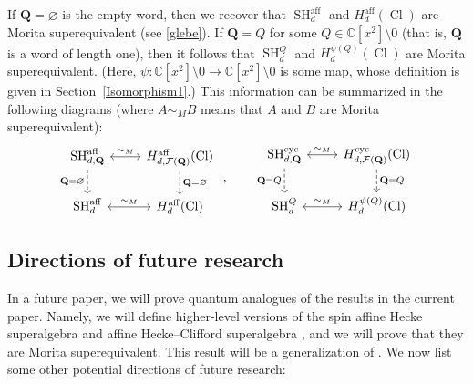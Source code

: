 \documentclass[11pt]{amsart}
\theoremstyle{definition}
\numberwithin{equation}{section}
\begin{document}
If $ \mathbf{Q} = \varnothing $ is the empty word, then we recover that $ \operatorname{SH}^{\operatorname{aff}}_{d} $ and $ H_{d}^{\operatorname{aff}}(\operatorname{Cl}) $ are Morita superequivalent (see \cref{glebe}). If $ \mathbf{Q} = Q $ for some $ Q \in \mathbb{C}[x^{2}] \setminus 0 $ (that is, $ \mathbf{Q} $ is a word of length one), then it follows that $ \operatorname{SH}^{Q}_{d} $ and $ H_{d}^{\psi(Q)}(\operatorname{Cl}) $ are Morita superequivalent. (Here, $ \psi \colon \mathbb{C}[x^{2}] \setminus 0 \rightarrow \mathbb{C}[x^{2}] \setminus 0 $ is some map, whose definition is given in Section~\ref{Isomorphism1}.) This information can be summarized in the following diagrams (where $ A \sim_{M} B $ means that \(A\) and \(B\) are Morita superequivalent):
\begin{equation}
\begin{tikzcd}
\operatorname{SH}^{\operatorname{aff}}_{d,\mathbf{Q}} \arrow[r, "\sim_M", <->] \arrow[d, dashed, "\mathbf{Q}=\varnothing"'] 
  & H_{d,\mathcal{F}(\mathbf{Q})}^{\operatorname{aff}}(\operatorname{Cl}) \arrow[d, dashed, "\mathbf{Q}=\varnothing"] \\
\operatorname{SH}^{\operatorname{aff}}_{d} \arrow[r, "\sim_M", <->] 
  & H_{d}^{\operatorname{aff}}(\operatorname{Cl})
\end{tikzcd} \ , 
\qquad
\begin{tikzcd}
\operatorname{SH}^{\operatorname{cyc}}_{d,\mathbf{Q}} \arrow[r, "\sim_M", <->] \arrow[d, dashed, "\mathbf{Q}=Q"'] 
  & H_{d,\mathcal{F}(\mathbf{Q})}^{\operatorname{cyc}}(\operatorname{Cl}) \arrow[d, dashed, "\mathbf{Q}=Q"] \\
\operatorname{SH}^{Q}_{d} \arrow[r, "\sim_M", <->] 
  & H_{d}^{\psi(Q)}(\operatorname{Cl})
\end{tikzcd}
\end{equation}



\subsection{Directions of future research}



In a future paper, we will prove quantum analogues of the results in the current paper. Namely, we will define higher-level versions of the spin affine Hecke superalgebra \cite{Wang2} and affine Hecke--Clifford superalgebra \cite{Jones-Nazarov}, and we will prove that they are Morita superequivalent. This result will be a generalization of \cite[Thm.~5.1]{Wang2}. We now list some other potential directions of future research: 
\end{document}
